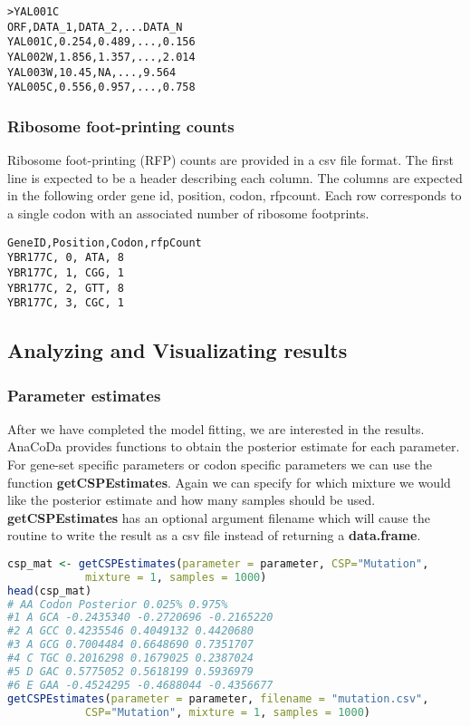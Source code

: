 \begin{verbatim}
>YAL001C
ORF,DATA_1,DATA_2,...DATA_N
YAL001C,0.254,0.489,...,0.156
YAL002W,1.856,1.357,...,2.014
YAL003W,10.45,NA,...,9.564
YAL005C,0.556,0.957,...,0.758
\end{verbatim}

\subsubsection{Ribosome foot-printing counts}

Ribosome foot-printing (RFP) counts are provided in a csv file format. The first line is expected to be a
header describing each column. The columns are expected in the following order gene id, position, codon,
rfpcount. Each row corresponds to a single codon with an associated number of ribosome footprints.

\begin{verbatim}
GeneID,Position,Codon,rfpCount
YBR177C, 0, ATA, 8
YBR177C, 1, CGG, 1
YBR177C, 2, GTT, 8
YBR177C, 3, CGC, 1
\end{verbatim}

\subsection{Analyzing and Visualizating results}

\subsubsection{Parameter estimates}

After we have completed the model fitting, we are interested in the results. 
AnaCoDa provides functions to obtain the posterior estimate for each parameter. 
For gene-set specific parameters or codon specific parameters we can use the function \textbf{getCSPEstimates}. 
Again we can specify for which mixture we would like the posterior estimate and how many samples should be used. 
\textbf{getCSPEstimates} has an optional argument filename which will cause the routine to write the result as a csv file instead of returning a \textbf{data.frame}.

\begin{lstlisting}[language=R]
csp_mat <- getCSPEstimates(parameter = parameter, CSP="Mutation", 
			mixture = 1, samples = 1000)
head(csp_mat)
# AA Codon Posterior 0.025% 0.975%
#1 A GCA -0.2435340 -0.2720696 -0.2165220
#2 A GCC 0.4235546 0.4049132 0.4420680
#3 A GCG 0.7004484 0.6648690 0.7351707
#4 C TGC 0.2016298 0.1679025 0.2387024
#5 D GAC 0.5775052 0.5618199 0.5936979
#6 E GAA -0.4524295 -0.4688044 -0.4356677
getCSPEstimates(parameter = parameter, filename = "mutation.csv",
			CSP="Mutation", mixture = 1, samples = 1000)
\end{lstlisting}

